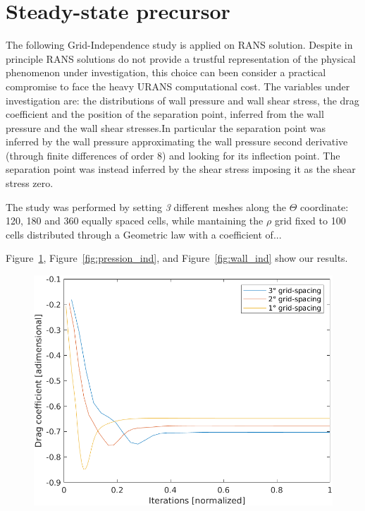\documentclass[12pt]{article}
\begin{document}
\section{Steady-state precursor} \label{sec:Steady-state precursor}

        The following Grid-Independence study is applied on RANS solution.   Despite in principle RANS solutions do not provide a trustful representation of the physical phenomenon under investigation, this choice can been consider a practical compromise to face the heavy URANS  computational cost. The variables under investigation are:  the distributions of wall pressure and wall shear stress, the drag coefficient and the position of the separation point, inferred from the wall pressure and the wall shear stresses.In particular the separation point was inferred by the wall pressure approximating the wall pressure second derivative (through finite differences of order 8) and looking for its inflection point. The separation point was instead inferred by the shear stress imposing it as the shear stress zero.
        
        The study was performed by setting \textit{3} different meshes along the $\Theta$ coordinate: 120, 180 and 360 equally spaced cells, while mantaining the $\rho$ grid fixed to 100 cells distributed through a Geometric law with a coefficient of...

        Figure~\ref{fig:drag_independence}, Figure~\ref{fig:pression_ind}, and Figure~\ref{fig:wall_ind} show our results.

        \begin{figure}[!ht]
                \includegraphics[width=\textwidth]{DragCoefficient_Independence.png}
                \centering
                \caption{}
                \label{fig:drag_independence}
        \end{figure}
\end{document}
